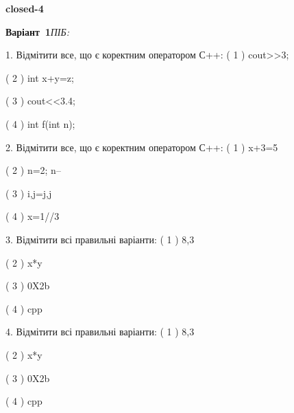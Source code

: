 \documentclass[11pt]{article}
\begin{document}
{\large\textbf{closed-4}}

\textbf{Варіант \No\,1}\hfill \textit{ПІБ:}\,\underline{\hspace{60mm}}
\vspace{4mm}

1. Відмітити все, що є коректним оператором С++:
( 1 ) cout>>3;

( 2 ) int x+y=z;

( 3 ) cout<<3.4;

( 4 ) int f(int n);

2. Відмітити все, що є коректним оператором С++:
( 1 ) x+3=5

( 2 ) n=2; n--

( 3 ) i,j=j,j

( 4 ) x=1//3

3. Відмітити всі правильні варіанти:
( 1 ) 8,3

( 2 ) x*y

( 3 ) 0X2b

( 4 ) cpp

4. Відмітити всі правильні варіанти:
( 1 ) 8,3

( 2 ) x*y

( 3 ) 0X2b

( 4 ) cpp





\newpage
\end{document}
